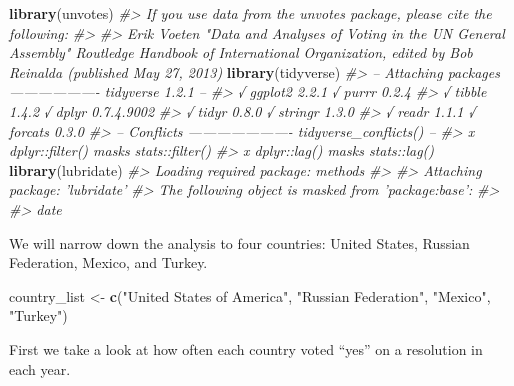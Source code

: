 \documentclass[]{book}
\newenvironment{Shaded}{\begin{snugshade}}{\end{snugshade}}
\newcommand{\KeywordTok}[1]{\textcolor[rgb]{0.13,0.29,0.53}{\textbf{#1}}}
\newcommand{\StringTok}[1]{\textcolor[rgb]{0.31,0.60,0.02}{#1}}
\newcommand{\CommentTok}[1]{\textcolor[rgb]{0.56,0.35,0.01}{\textit{#1}}}
\newcommand{\NormalTok}[1]{#1}
\theoremstyle{definition}
\theoremstyle{definition}
\theoremstyle{definition}
\theoremstyle{remark}
\begin{document}
\begin{Shaded}
\begin{Highlighting}[]
\KeywordTok{library}\NormalTok{(unvotes)}
\CommentTok{#> If you use data from the unvotes package, please cite the following:}
\CommentTok{#> }
\CommentTok{#> Erik Voeten "Data and Analyses of Voting in the UN General Assembly" Routledge Handbook of International Organization, edited by Bob Reinalda (published May 27, 2013)}
\KeywordTok{library}\NormalTok{(tidyverse)}
\CommentTok{#> -- Attaching packages ------------------- tidyverse 1.2.1 --}
\CommentTok{#> √ ggplot2 2.2.1          √ purrr   0.2.4     }
\CommentTok{#> √ tibble  1.4.2          √ dplyr   0.7.4.9002}
\CommentTok{#> √ tidyr   0.8.0          √ stringr 1.3.0     }
\CommentTok{#> √ readr   1.1.1          √ forcats 0.3.0}
\CommentTok{#> -- Conflicts ---------------------- tidyverse_conflicts() --}
\CommentTok{#> x dplyr::filter() masks stats::filter()}
\CommentTok{#> x dplyr::lag()    masks stats::lag()}
\KeywordTok{library}\NormalTok{(lubridate)}
\CommentTok{#> Loading required package: methods}
\CommentTok{#> }
\CommentTok{#> Attaching package: 'lubridate'}
\CommentTok{#> The following object is masked from 'package:base':}
\CommentTok{#> }
\CommentTok{#>     date}
\end{Highlighting}
\end{Shaded}

We will narrow down the analysis to four countries: United States,
Russian Federation, Mexico, and Turkey.

\begin{Shaded}
\begin{Highlighting}[]
\NormalTok{country_list <-}\StringTok{ }\KeywordTok{c}\NormalTok{(}\StringTok{"United States of America"}\NormalTok{, }\StringTok{"Russian Federation"}\NormalTok{, }
                  \StringTok{"Mexico"}\NormalTok{, }\StringTok{"Turkey"}\NormalTok{)}
\end{Highlighting}
\end{Shaded}

First we take a look at how often each country voted ``yes'' on a
resolution in each year.
\end{document}
